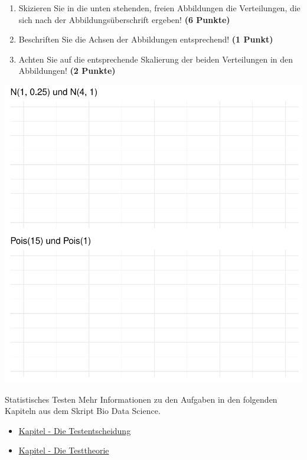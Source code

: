 \documentclass[a4paper, 9pt]{scrartcl}\usepackage[]{graphicx}\usepackage[]{xcolor}
\makeatletter
\def\maxwidth{ %
  \ifdim\Gin@nat@width>\linewidth
    \linewidth
  \else
    \Gin@nat@width
  \fi
}
\makeatother
\begin{document}
\begin{enumerate}
\item Skizieren Sie in die unten stehenden, freien Abbildungen die
  Verteilungen, die sich nach der Abbildungs{\"u}berschrift ergeben! \textbf{(6
    Punkte)}
\item Beschriften Sie die Achsen der Abbildungen entsprechend! \textbf{(1
    Punkt)}
\item Achten Sie auf die entsprechende Skalierung der beiden Verteilungen
  in den Abbildungen! \textbf{(2 Punkte)}
\end{enumerate}



{\centering \includegraphics[width=\maxwidth]{img/histogram-01-1} 

}



 
\clearpage
\begin{graybox}{Statistisches Testen}
Mehr Informationen zu den Aufgaben in den folgenden Kapiteln aus dem Skript Bio Data Science.
  \begin{itemize}
  \item \href{https://jkruppa.github.io/stat-tests-basic.html}{Kapitel - Die Testentscheidung}
  \item \href{https://jkruppa.github.io/stat-tests-theorie.html}{Kapitel - Die Testtheorie}
  \end{itemize}
\end{graybox}
\clearpage
\end{document}
